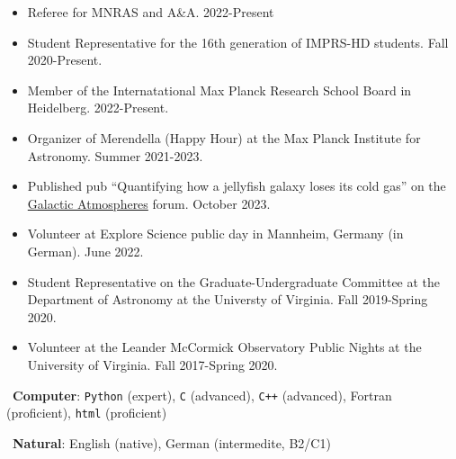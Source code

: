 \documentclass[a4paper,10pt,oneside]{article}
\begin{document}
\noindent{}

\begin{itemize}[wide, labelwidth=!, labelindent=-11pt, parsep=0pt]
    \item Referee for MNRAS and A\&A. 2022-Present
    \item Student Representative for the 16th generation of IMPRS-HD students. Fall 2020-Present. 
    \item Member of the Internatational Max Planck Research School Board in Heidelberg. 2022-Present.
    \item Organizer of Merendella (Happy Hour) at the Max Planck Institute for Astronomy. Summer 2021-2023.
    \item Published pub ``Quantifying how a jellyfish galaxy loses its cold gas'' on the \href{https://galacticatmospheres.pubpub.org/pub/8t27n1yz/release/1}{Galactic Atmospheres} forum. October 2023.
    \item Volunteer at Explore Science public day in Mannheim, Germany (in German). June 2022.
    \item Student Representative on the Graduate-Undergraduate Committee at the Department of Astronomy at the Universty of Virginia. Fall 2019-Spring 2020.
    \item Volunteer at the Leander McCormick Observatory Public Nights at the University of Virginia. Fall 2017-Spring 2020.
\end{itemize}

\noindent{}

\vspace{5.5pt}

\noindent \hspace{-19pt} \faKeyboardO\ {\bf Computer}: \texttt{Python} (expert), \texttt{C} (advanced), \texttt{C++} (advanced), Fortran (proficient), \texttt{html} (proficient)

\vspace{5.5pt}

\noindent \hspace{-17pt} \faLanguage\ {\bf Natural}: English (native), German (intermedite, B2/C1) \\

\begin{comment}
\vspace{11pt} 
{\it Last updated \today.}
\end{comment}
\end{document}
